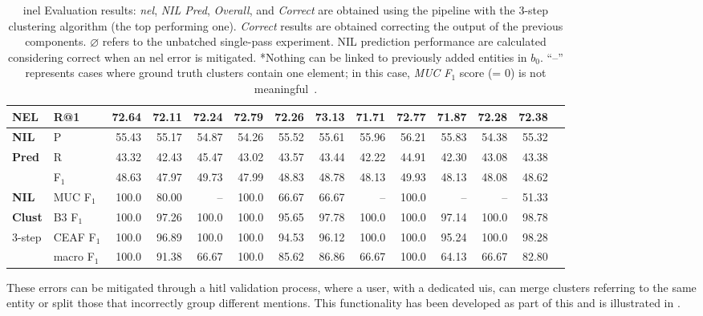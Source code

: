 \begin{landscape}
\begin{table}
\begin{tabular}{llrrrrrrrrrrrr}
\textbf{NEL} & R@1          &   72.64 &  72.11 &   72.24 &   72.79 &  72.26 &  73.13 &   71.71 &   72.77 &  71.87 &   72.28 &  72.38 & \\
\hline
\textbf{NIL} & P            &   55.43 &  55.17 &   54.87 &   54.26 &  55.52 &  55.61 &   55.96 &   56.21 &  55.83 &   54.38 &  55.32 & \\
\textbf{Pred} & R            &   43.32 &  42.43 &   45.47 &   43.02 &  43.57 &  43.44 &   42.22 &   44.91 &  42.30 &   43.08 &  43.38 & \\
& F$_1$           &   48.63 &  47.97 &   49.73 &   47.99 &  48.83 &  48.78 &   48.13 &   49.93 &  48.13 &   48.08 &  48.62 & \\
\hline
\textbf{NIL} & MUC F$_1$       &  100.0 &  80.00 &    -- &  100.0 &  66.67 &  66.67 &    -- &  100.0 &   -- &    -- &  51.33 & \\
\textbf{Clust} & B3 F$_1$        &  100.0 &  97.26 &  100.0 &  100.0 &  95.65 &  97.78 &  100.0 &  100.0 &  97.14 &  100.0 &  98.78 & \\
3-step & CEAF F$_1$      &  100.0 &  96.89 &  100.0 &  100.0 &  94.53 &  96.12 &  100.0 &  100.0 &  95.24 &  100.0 &  98.28 & \\
& macro F$_1$       &  100.0 &  91.38 &   66.67 &  100.0 &  85.62 &  86.86 &   66.67 &  100.0 &  64.13 &   66.67 &  82.80 & \\
\bottomrule
\end{tabular}
    \caption[\acs{inel} Evaluation results.]{\acs{inel} Evaluation results: \textit{\ac{nel}}, \textit{NIL Pred}, \textit{Overall}, and \textit{Correct} are obtained using the pipeline with the 3-step clustering algorithm (the top performing one). \textit{Correct} results are obtained correcting the output of the previous components. $\varnothing$ refers to the unbatched single-pass experiment. NIL prediction performance are calculated considering correct when an \ac{nel} error is mitigated. *Nothing can be linked to previously added entities in $b_{0}$. ``--'' represents cases where ground truth clusters contain one element; in this case, \textit{MUC F$_1$} score (= 0) is not meaningful~\cite{recasens_hovy_2011}.}
    \label{tab:superresults}
\end{table}
\end{landscape}

These errors can be mitigated through a \acl{hitl} validation process, where a user, with a dedicated \acp{ui}, can merge clusters referring to the same entity or split those that incorrectly group different mentions. This functionality has been developed as part of this \phd and is illustrated in .




